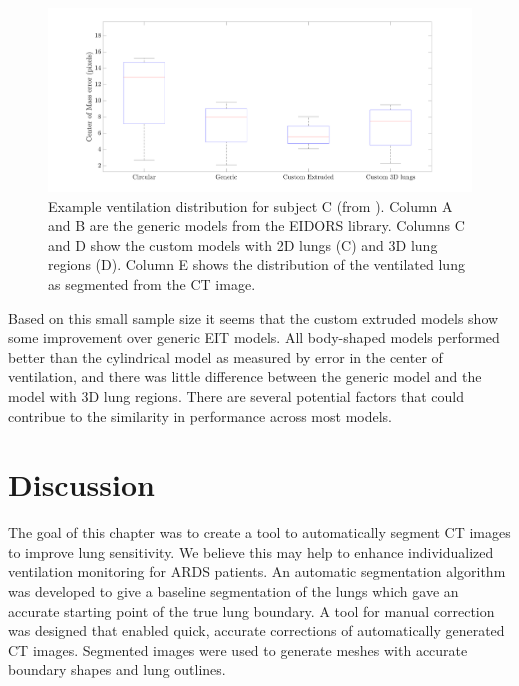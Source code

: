 \begin{figure}[H]
	\centering
	\includegraphics[width=\textwidth]{chapter5-CT_to_mesh/imgs/error_boxplot.pdf}
	\caption[Example ventilation distributions]{\label{fig:c-of-m-error}%
	Example ventilation distribution for subject C (from ).
	Column A and B are the generic models from the EIDORS library. 
	Columns C and D show the custom models with 2D lungs (C) and 3D lung regions (D).
	Column E shows the distribution of the ventilated lung as segmented from the CT image. 
	}
\end{figure}

Based on this small sample size it seems that the custom extruded models show some improvement 
over generic EIT models. 
All body-shaped models performed better than the cylindrical model 
as measured by error in the center of ventilation,
and there was little difference between the generic model and the model with 3D lung regions. 
There are several potential factors that could contribue to the similarity in performance across
most models. 

\section{Discussion}
The goal of this chapter was to create a tool to automatically segment CT images 
to improve lung sensitivity. 
We believe this may help to enhance individualized ventilation monitoring for ARDS patients. 
An automatic segmentation algorithm was developed to give a baseline segmentation of the lungs which 
gave an accurate starting point of the true lung boundary. A tool for manual correction was designed 
that enabled quick, accurate corrections of automatically generated CT images. 
Segmented images were used to generate meshes with accurate boundary  shapes and lung outlines. 


